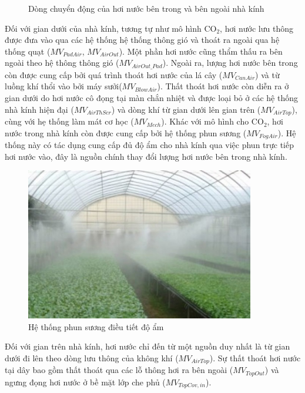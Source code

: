 \documentclass[a4paper]{article}
\begin{document}
\begin{figure}[H]
\begin{tikzpicture}[x=0.75pt,y=0.75pt,yscale=-1,xscale=1]
\end{tikzpicture}

		\caption{Dòng chuyển động của hơi nước bên trong và bên ngoài nhà kính}
		\label{fig:vapourmodel}
\end{figure}

Đối với gian dưới của nhà kính, tương tự như mô hình $\mathrm{CO_2}$, hơi nước lưu thông được đưa vào qua các hệ thống hệ thống thông gió và thoát ra ngoài qua hệ thống quạt ($MV_{PadAir}$, $MV_{AirOut}$). Một phần hơi nước cũng thẩm thấu ra bên ngoài theo hệ thông thông gió ($MV_{AirOut\_Pad}$). Ngoài ra, lượng hơi nước bên trong còn được cung cấp bởi quá trình thoát hơi nước của lá cây ($MV_{CanAir}$) và từ luồng khí thổi vào bởi máy sưởi($MV_{BlowAir}$). Thất thoát hơi nước còn diễn ra ở gian dưới do hơi nước cô đọng tại màn chắn nhiệt và được loại bỏ ở các hệ thống nhà kính hiện đại ($MV_{AirThScr}$) và dòng khí từ gian dưới lên gian trên ($MV_{AirTop}$), cùng với hẹ thống làm mát cơ học ($MV_{Mech}$). Khác với mô hình cho $\mathrm{CO_2}$, hơi nước trong nhà kính còn được cung cấp bởi hệ thống phun sương ($MV_{FogAir}$). Hệ thống này có tác dụng cung cấp đủ độ ẩm cho nhà kính qua việc phun trực tiếp hơi nước vào, đây là nguồn chính thay đổi lượng hơi nước bên trong nhà kính. 

\begin{figure}[H]
	\begin{center}
		\includegraphics[width=10cm]{fogging.jpg}
		\caption{Hệ thống phun sương điều tiết độ ẩm}
		\label{fig:fogginsystem}
	\end{center}
\end{figure}

Đối với gian trên nhà kính, hơi nước chỉ đến từ một nguồn duy nhất là từ gian dưới đi lên theo dòng lưu thông của không khí ($MV_{AirTop}$). Sự thất thoát hơi nước tại dây bao gồm thất thoát qua các lỗ thông hơi ra bên ngoài ($MV_{TopOut}$) và ngưng đọng hơi nước ở bề mặt lớp che phủ ($MV_{TopCov,in}$).
\end{document}
